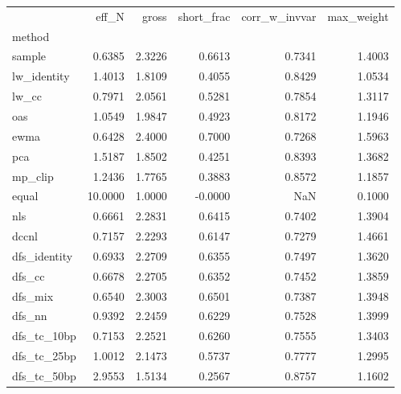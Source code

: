 \begin{tabular}{lrrrrr}
\toprule
 & eff_N & gross & short_frac & corr_w_invvar & max_weight \\
method &  &  &  &  &  \\
\midrule
sample & 0.6385 & 2.3226 & 0.6613 & 0.7341 & 1.4003 \\
lw_identity & 1.4013 & 1.8109 & 0.4055 & 0.8429 & 1.0534 \\
lw_cc & 0.7971 & 2.0561 & 0.5281 & 0.7854 & 1.3117 \\
oas & 1.0549 & 1.9847 & 0.4923 & 0.8172 & 1.1946 \\
ewma & 0.6428 & 2.4000 & 0.7000 & 0.7268 & 1.5963 \\
pca & 1.5187 & 1.8502 & 0.4251 & 0.8393 & 1.3682 \\
mp_clip & 1.2436 & 1.7765 & 0.3883 & 0.8572 & 1.1857 \\
equal & 10.0000 & 1.0000 & -0.0000 & NaN & 0.1000 \\
nls & 0.6661 & 2.2831 & 0.6415 & 0.7402 & 1.3904 \\
dccnl & 0.7157 & 2.2293 & 0.6147 & 0.7279 & 1.4661 \\
dfs_identity & 0.6933 & 2.2709 & 0.6355 & 0.7497 & 1.3620 \\
dfs_cc & 0.6678 & 2.2705 & 0.6352 & 0.7452 & 1.3859 \\
dfs_mix & 0.6540 & 2.3003 & 0.6501 & 0.7387 & 1.3948 \\
dfs_nn & 0.9392 & 2.2459 & 0.6229 & 0.7528 & 1.3999 \\
dfs_tc_10bp & 0.7153 & 2.2521 & 0.6260 & 0.7555 & 1.3403 \\
dfs_tc_25bp & 1.0012 & 2.1473 & 0.5737 & 0.7777 & 1.2995 \\
dfs_tc_50bp & 2.9553 & 1.5134 & 0.2567 & 0.8757 & 1.1602 \\
\bottomrule
\end{tabular}

